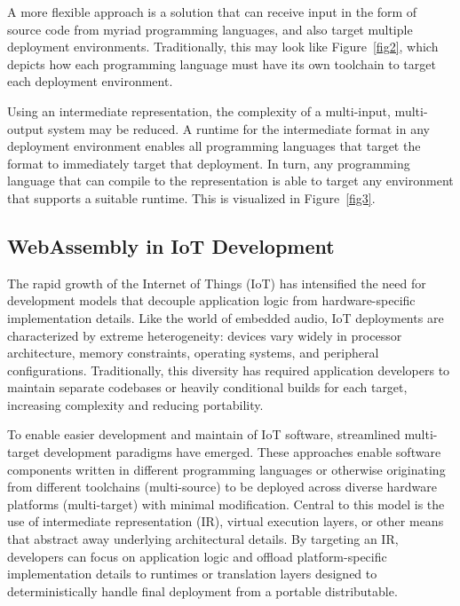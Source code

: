\documentclass[a4paper]{article}
\begin{document}
\vspace{12pt}

A more flexible approach is a solution that can receive input in the form of source code from myriad programming languages, and also target multiple deployment environments. Traditionally, this may look like Figure~\ref{fig2}, which depicts how each programming language must have its own toolchain to target each deployment environment. 

Using an intermediate representation, the complexity of a multi-input, multi-output system may be reduced. A runtime for the intermediate format in any deployment environment enables all programming languages that target the format to immediately target that deployment. In turn, any programming language that can compile to the representation is able to target any environment that supports a suitable runtime. This is visualized in Figure~\ref{fig3}.

\subsection{ WebAssembly in IoT Development }

The rapid growth of the Internet of Things (IoT) has intensified the need for development models that decouple application logic from hardware-specific implementation details\cite{PATEL201562}. Like the world of embedded audio, IoT deployments are characterized by extreme heterogeneity: devices vary widely in processor architecture, memory constraints, operating systems, and peripheral configurations. Traditionally, this diversity has required application developers to maintain separate codebases or heavily conditional builds for each target, increasing complexity and reducing portability.

To enable easier development and maintain of IoT software, streamlined multi-target development paradigms have emerged. These approaches enable software components written in different programming languages or otherwise originating from different toolchains (multi-source) to be deployed across diverse hardware platforms (multi-target) with minimal modification. Central to this model is the use of intermediate representation (IR), virtual execution layers, or other means that abstract away underlying architectural details. By targeting an IR, developers can focus on application logic and offload platform-specific implementation details to runtimes or translation layers designed to deterministically handle final deployment from a portable distributable.
\end{document}
